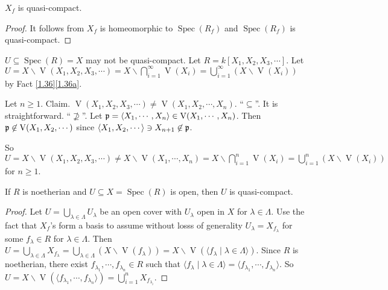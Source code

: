 \begin{corollary}\label{2.29}
    $X_f$ is quasi-compact.
\end{corollary}

\begin{proof}
    It follows from $X_f$ is homeomorphic to $\operatorname{Spec}(R_f)$ and $\operatorname{Spec}(R_f)$ is quasi-compact.
\end{proof}

\begin{example*}
    $U \subseteq \operatorname{Spec}(R) = X$ may not be quasi-compact. Let $R = k[X_1,X_2,X_3,\cdots]$. Let $U = X \smallsetminus \operatorname{V}(X_1,X_2,X_3,\cdots) = X \smallsetminus \bigcap_{i=1}^{\infty} \operatorname{V}(X_i) = \bigcup_{i=1}^\infty (X \smallsetminus \operatorname{V}(X_i))$ by Fact \ref{1.36}\ref{1.36a}. \par 
    Let $n \geq 1$. Claim. $\operatorname{V}(X_1,X_2,X_3,\cdots) \neq \operatorname{V}(X_1,X_2,\cdots,X_n)$. ``$\subseteq$''. It is straightforward. ``$\not \supseteq$''. Let $\mathfrak{p} = \langle X_1,\cdots,X_n \rangle \in \operatorname{V}(X_1,\cdots,X_n)$. Then $\mathfrak{p} \not \in \operatorname{V}(X_1,X_2,\cdots)$ since $\langle X_1,X_2,\cdots \rangle\ni X_{n+1} \not \in \mathfrak{p}$. \par 
    So $U = X \smallsetminus \operatorname{V}(X_1,X_2,X_3,\cdots) \neq X \smallsetminus \operatorname{V}(X_1,\cdots,X_n) = X \smallsetminus \bigcap_{i=1}^{n} \operatorname{V}(X_i) = \bigcup_{i=1}^n (X \smallsetminus \operatorname{V}(X_i))$ for $n \geq 1$. 
\end{example*}

\begin{fact*}
    If $R$ is noetherian and $U \subseteq X = \operatorname{Spec}(R)$ is open, then $U$ is quasi-compact. 
\end{fact*}

\begin{proof}
    Let $U = \bigcup_{\lambda \in \Lambda}U_\lambda$ be an open cover with $U_\lambda$ open in $X$ for $\lambda \in \Lambda$. Use the fact that $X_f$'s form a basis to assume without losss of generality $U_\lambda = X_{f_\lambda}$ for some $f_\lambda \in R$ for $\lambda \in \Lambda$. Then $U = \bigcup_{\lambda \in \Lambda} X_{f_\lambda} = \bigcup_{\lambda \in \Lambda} (X \smallsetminus \operatorname{V}(f_\lambda)) = X \smallsetminus \operatorname{V}(\langle f_\lambda \mid \lambda \in \Lambda \rangle)$. Since $R$ is noetherian, there exist $f_{\lambda_1},\cdots,f_{\lambda_n} \in R$ such that $\langle f_\lambda \mid \lambda \in \Lambda \rangle = \langle f_{\lambda_1},\cdots,f_{\lambda_n} \rangle$. So $U = X \smallsetminus \operatorname{V}(\langle f_{\lambda_1},\cdots,f_{\lambda_n} \rangle) = \bigcup_{i=1}^n X_{f_{\lambda_i}}$. 
\end{proof}

